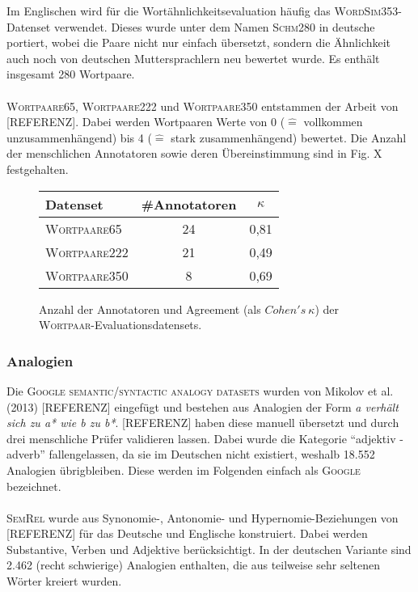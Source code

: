    Im Englischen wird für die Wortähnlichkeitsevaluation häufig das \textsc{WordSim353}-Datenset verwendet. Dieses
    wurde unter dem Namen \textsc{Schm280} in deutsche portiert, wobei die Paare nicht nur einfach übersetzt, sondern die
    Ähnlichkeit auch noch von deutschen Muttersprachlern neu bewertet wurde. Es enthält insgesamt 280 Wortpaare.\\ \\
    \textsc{Wortpaare65}, \textsc{Wortpaare222} und \textsc{Wortpaare350} entstammen der Arbeit von [REFERENZ]. Dabei werden Wortpaaren
    Werte von 0 ($\hat{=}$ vollkommen unzusammenhängend) bis 4 ($\hat{=}$ stark zusammenhängend) bewertet. Die Anzahl
    der menschlichen Annotatoren sowie deren Übereinstimmung sind in Fig. X festgehalten.

    \begin{figure}[h]
      \centering
      \begin{tabular}{l|cc}
        Datenset & \#Annotatoren & $\kappa$ \\
        \hline
        \textsc{Wortpaare65} & 24 & 0,81 \\
        \textsc{Wortpaare222} & 21 & 0,49 \\
        \textsc{Wortpaare350} & 8 & 0,69 \\
      \end{tabular}
      \caption{Anzahl der Annotatoren und Agreement (als $Cohen's\ \kappa$) der \textsc{Wortpaar}-Evaluationsdatensets.}
    \end{figure}

    \subsubsection{Analogien}

    Die \textsc{Google semantic/syntactic analogy datasets} wurden von Mikolov et al. (2013) [REFERENZ] eingefügt und bestehen
    aus Analogien der Form \emph{a verhält sich zu a* wie b zu b*}. [REFERENZ] haben diese manuell übersetzt und durch
    drei menschliche Prüfer validieren lassen. Dabei wurde die Kategorie ``adjektiv - adverb'' fallengelassen, da sie
    im Deutschen nicht existiert, weshalb 18.552 Analogien übrigbleiben. Diese werden im Folgenden einfach als
    \textsc{Google} bezeichnet.\\ \\
    \textsc{SemRel} wurde aus Synonomie-, Antonomie- und Hypernomie-Beziehungen von [REFERENZ] für das Deutsche und Englische
    konstruiert. Dabei werden Substantive, Verben und Adjektive berücksichtigt. In der deutschen Variante sind 2.462 (recht schwierige) Analogien enthalten,
    die aus teilweise sehr seltenen Wörter kreiert wurden.

